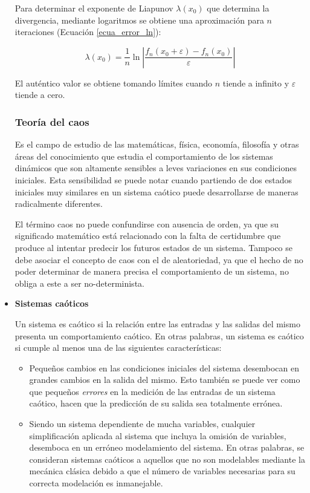 \documentclass[letterpaper, 11pt, oneside]{article}
\theoremstyle{definition}
\theoremstyle{remark}
\begin{document}
\begin{itemize}
Para determinar el exponente de Liapunov $ \lambda(x_0)$ que determina la divergencia, mediante logaritmos se obtiene una aproximación para $n$ iteraciones (Ecuación \ref{ecua_error_ln}):

\begin{equation}
	\lambda ( x_0 ) = \frac{1}{n} \ln  \left | \frac {f_n ( x_0 + \varepsilon) - f_n ( x_0 )} {\varepsilon}  \right |
	\label{ecua_error_ln}
\end{equation}

El auténtico valor se obtiene tomando límites cuando $n$ tiende a infinito y $\varepsilon$ tiende a cero.

\subsubsection{Teoría del caos}
Es el campo de estudio de las matemáticas, física, economía, filosofía y otras áreas del conocimiento que estudia el comportamiento de los sistemas dinámicos que son altamente sensibles a leves variaciones en sus condiciones iniciales. Esta sensibilidad se puede notar cuando partiendo de dos estados iniciales muy similares en un sistema caótico puede desarrollarse de maneras radicalmente diferentes. \cite{Angel08}

El término caos no puede confundirse con ausencia de orden, ya que su significado matemático está relacionado con la falta de certidumbre que produce al intentar predecir los futuros estados de un sistema. Tampoco se debe asociar el concepto de caos con el de aleatoriedad, ya que el hecho de no poder determinar de manera precisa el comportamiento de un sistema, no obliga a este a ser no-determinista.

\item {\bf Sistemas caóticos \par}
Un sistema es caótico si la relación entre las entradas y las salidas del mismo presenta un comportamiento caótico. En otras palabras, un sistema es caótico si cumple al menos una de las siguientes características:
\begin{itemize}
 \item Pequeños cambios en las condiciones iniciales del sistema desembocan en grandes cambios en la salida del mismo. Esto también se puede ver como que pequeños \emph{errores} en la medición de las entradas de un sistema caótico, hacen que la predicción de su salida sea totalmente errónea.
 \item Siendo un sistema dependiente de mucha variables, cualquier simplificación aplicada al sistema que incluya la omisión de variables, desemboca en un erróneo modelamiento del sistema. En otras palabras, se consideran sistemas caóticos a aquellos que no son modelables mediante la mecánica clásica debido a que el número de variables necesarias para su correcta modelación es inmanejable.
\end{itemize}


\end{itemize}
\end{document}
